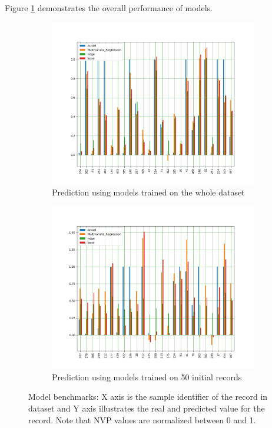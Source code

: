 \documentclass[12pt]{article}
\begin{document}
Figure \ref{fig:benchmark} demonstrates the overall performance of models.
\begin{figure}[h!]
  \centering
  \begin{subfigure}[b]{0.4\linewidth}
    \includegraphics[width=\linewidth]{./plots/actual_predicted_difference.png}
    \caption{Prediction using models trained on the whole dataset}
  \end{subfigure} 
  \begin{subfigure}[b]{0.4\linewidth}
    \includegraphics[width=\linewidth]{./plots/actual_predicted_difference_50.png}
    \caption{Prediction using models trained on 50 initial records}
  \end{subfigure}
  \caption{Model benchmarks: X axis is the sample identifier of the record in dataset and Y axis illustrates the real and predicted value for the record. Note that NVP values are normalized between 0 and 1.}
  \label{fig:benchmark}
\end{figure}
\end{document}
